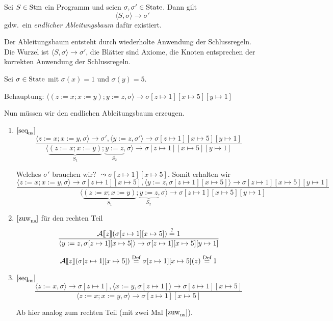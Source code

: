 \begin{definition}
    Sei $S \in \operatorname{Stm}$ ein Programm und seien $\sigma, \sigma' \in \operatorname{State}$. Dann gilt
    \[
        \langle S, \sigma \rangle \to \sigma'
    \]
    gdw.\ ein \emph{endlicher Ableitungsbaum} dafür existiert.

    Der Ableitungsbaum entsteht durch wiederholte Anwendung der Schlussregeln. Die Wurzel ist $\langle S, \sigma \rangle \to \sigma'$, die Blätter sind Axiome, die Knoten entsprechen der korrekten Anwendung der Schlussregeln.
\end{definition}

\begin{example}
    Sei $\sigma \in \operatorname{State}$ mit $\sigma(x) = 1$ und $\sigma(y) = 5$.

    Behauptung: $\langle (z := x; x := y); y := z, \sigma \rangle \to \sigma[z \mapsto 1][x \mapsto 5][y \mapsto 1]$

    Nun müssen wir den endlichen Ableitungsbaum erzeugen.


    \begin{enumerate}
        \item $[\text{seq}_{\text{ns}}^{}]$
            \[
            \frac{\langle z := x; x := y, \sigma \rangle \to \sigma', \langle y := z, \sigma' \rangle \to \sigma[z \mapsto 1][x \mapsto 5][y \mapsto 1]}{\langle \underbrace{(z := x; x := y)}_{S_1}; \underbrace{y := z}_{S_2}, \sigma \rangle \to \sigma[z \mapsto 1][x \mapsto 5][y \mapsto 1]}
            \]

            Welches $\sigma'$ brauchen wir? $\leadsto \sigma[z \mapsto 1][x \mapsto 5]$. Somit erhalten wir
            \[
            \frac{\langle z := x; x := y, \sigma \rangle \to \sigma[z \mapsto 1][x \mapsto 5], \langle y := z, \sigma[z \mapsto 1][x \mapsto 5] \rangle \to \sigma[z \mapsto 1][x \mapsto 5][y \mapsto 1]}{\langle \underbrace{(z := x; x := y)}_{S_1}; \underbrace{y := z}_{S_2}, \sigma \rangle \to \sigma[z \mapsto 1][x \mapsto 5][y \mapsto 1]}
            \]

        \item $[\text{zuw}_{\text{ns}}^{}]$ für den rechten Teil
            \[
            \frac{\mathcal{A}\mathrm{[}\kern-.14em\mathrm{[} z\mathrm{]}\kern-.14em\mathrm{]}(\sigma[z \mapsto 1][x \mapsto 5]) \overset{?}{=} 1}{\langle y := z, \sigma[z \mapsto 1][x \mapsto 5] \rangle \to \sigma[z \mapsto 1][x \mapsto 5][y \mapsto 1]}
            \]

            \[
            \mathcal{A}\mathrm{[}\kern-.14em\mathrm{[} z\mathrm{]}\kern-.14em\mathrm{]}(\sigma[z \mapsto 1][x \mapsto 5]) \overset{\text{Def}}{=} \sigma[z \mapsto 1][x \mapsto 5](z) \overset{\text{Def}}{=} 1
            \]

        \item $[\text{seq}_{\text{ns}}^{}]$
            \[
            \frac{\langle z := x, \sigma \rangle \to \sigma[z \mapsto 1], \langle x := y, \sigma[z \mapsto 1] \rangle \to \sigma[z \mapsto 1][x \mapsto 5]}{\langle z := x; x := y, \sigma \rangle \to \sigma[z \mapsto 1][x \mapsto 5]}
            \]

            Ab hier analog zum rechten Teil (mit zwei Mal $[\text{zuw}_{\text{ns}}^{}]$).
    \end{enumerate}
\end{example}

